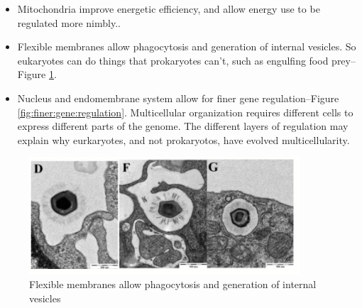 \documentclass[]{article}
\begin{document}
\begin{itemize}
	\item Mitochondria improve energetic efficiency, and allow energy use to be regulated more nimbly.\cite{lane2010energetics}.
	
	\item Flexible membranes allow phagocytosis and generation of internal vesicles. So eukaryotes can do things that prokaryotes can't, such as engulfing food prey--Figure \ref{fig:engulf}.
	
	\item Nucleus and endomembrane system allow for finer gene
	regulation--Figure \ref{fig:finer:gene:regulation}\cite{paez2016endocytosis}. Multicellular organization requires different cells to express different parts of the genome. The different layers of regulation may explain why eurkaryotes, and not prokaryotos, have evolved multicellularity.
\end{itemize}

\begin{figure}[H]
	\caption{Flexible membranes allow phagocytosis and generation
		of internal vesicles}
	\label{fig:engulf}
	\includegraphics[width=0.9\textwidth]{Engulf}
\end{figure}
\end{document}
